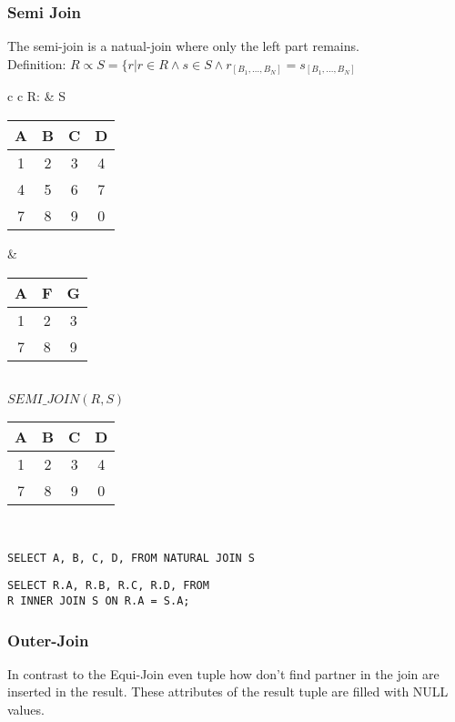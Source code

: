\subsubsection{Semi Join}
The semi-join is a natual-join where only the left part remains.\\
Definition: $R \propto S = \{r | r \in R \land s \in S
\land r_{[B_1, \dots, B_N]} = s_{[B_1, \dots, B_N]}$

\hspace{-0.5cm}
\begin{tabular}{ c c}
	R: & S \\
	\begin{tabular}{|c|c|c|c|}
		\hline
		A & B & C & D\\
		\hline
		1 & 2 & 3 & 4\\
		\hline
		4 & 5 & 6 & 7\\
		\hline
		7 & 8 & 9 & 0\\
		\hline
	\end{tabular} &

	\begin{tabular}{|c|c|c|}
		\hline
		A & F & G \\
		\hline
		1 & 2 & 3\\
		\hline
		7 & 8 & 9\\
		\hline
	\end{tabular}
\end{tabular}\\

$SEMI\_JOIN(R,S)$\\
\begin{tabular}{|c|c|c|c|}
	\hline
	A & B & C & D\\
	\hline
	1 & 2 & 3 & 4\\
	\hline
	7 & 8 & 9 & 0\\
	\hline
\end{tabular}\\

\lstset{language=SQL,tabsize=4,captionpos=b,frame=single,
basicstyle=\footnotesize}
\begin{lstlisting}[caption=SQL Semi-Join]
SELECT A, B, C, D, FROM NATURAL JOIN S
\end{lstlisting}
\begin{lstlisting}[caption=SQL Semi-Join]
SELECT R.A, R.B, R.C, R.D, FROM 
R INNER JOIN S ON R.A = S.A;
\end{lstlisting}

\subsubsection{Outer-Join}
In contrast to the Equi-Join even tuple how don't find partner in the join are
inserted in the result. These attributes of the result tuple are filled with
NULL values.

